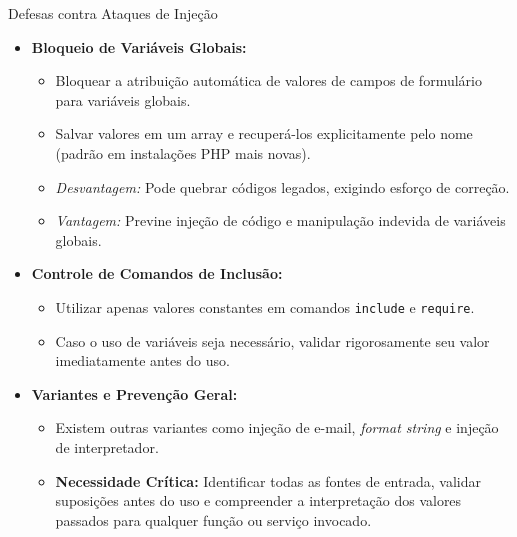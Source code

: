 \begin{frame}{Defesas contra Ataques de Injeção}
    \begin{itemize}
        \item \textbf{Bloqueio de Variáveis Globais:}
              \begin{itemize}
                  \item Bloquear a atribuição automática de valores de campos de formulário para variáveis globais.
                  \item Salvar valores em um array e recuperá-los explicitamente pelo nome (padrão em instalações PHP mais novas).
                  \item \textit{Desvantagem:} Pode quebrar códigos legados, exigindo esforço de correção.
                  \item \textit{Vantagem:} Previne injeção de código e manipulação indevida de variáveis globais.
              \end{itemize}

        \item \textbf{Controle de Comandos de Inclusão:}
              \begin{itemize}
                  \item Utilizar apenas valores constantes em comandos \texttt{include} e \texttt{require}.
                  \item Caso o uso de variáveis seja necessário, validar rigorosamente seu valor imediatamente antes do uso.
              \end{itemize}

        \item \textbf{Variantes e Prevenção Geral:}
              \begin{itemize}
                  \item Existem outras variantes como injeção de e-mail, \textit{format string} e injeção de interpretador.
                  \item \textbf{Necessidade Crítica:} Identificar todas as fontes de entrada, validar suposições antes do uso e compreender a interpretação dos valores passados para qualquer função ou serviço invocado.
              \end{itemize}
    \end{itemize}
\end{frame}


